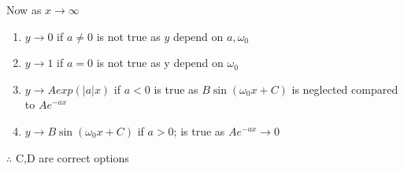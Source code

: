 \documentclass[journal,12pt,onecolumn]{IEEEtran}
\theoremstyle{remark}
\begin{document}
 Now as $x\to \infty$
 \begin{enumerate}
     \item $y \to 0$ if $a \neq 0$ is not true as $y$ depend on $a,\omega_0$
     \item $y \to 1 $ if $ a=0$ is not true as y depend on $\omega_0$
     \item $y \to Aexp(|a|x)$ if $a < 0$ is true as $ B\sin(\omega_0 x+C)$ is neglected compared to $A e^{-ax}$
     \item $y \to B \sin(\omega_0 x+C)$ if $a>0$; is true as $A e^{-ax} \to 0$ 
     
 \end{enumerate}
  $\therefore$ C,D are correct options
 
 
\end{document}
